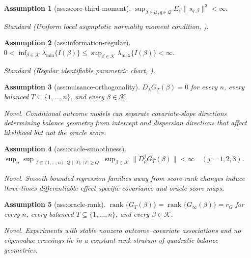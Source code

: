 \documentclass{article}
\newtheorem{assumption}{Assumption}
\begin{document}
\begin{assumption}[ass:score-third-moment]\label{ass:score-third-moment}
\(\sup_{\beta\in\mathcal U,q\in\mathcal Q}E_{\beta}\lVert s_{q,\beta}\rVert^{3}<\infty\).
\par\smallskip\noindent\emph{Standard} (Uniform local asymptotic normality moment condition, \cite{VanDerVaart1998AsymptoticStatistics}).
\end{assumption}

\begin{assumption}[ass:information-regular]\label{ass:information-regular}
\(0<\inf_{\beta\in\mathcal K}\lambda_{\min}\{I(\beta)\}\le\sup_{\beta\in\mathcal K}\lambda_{\max}\{I(\beta)\}<\infty\).
\par\smallskip\noindent\emph{Standard} (Regular identifiable parametric chart, \cite{VanDerVaart1998AsymptoticStatistics}).
\end{assumption}

\begin{assumption}[ass:nuisance-orthogonality]\label{ass:nuisance-orthogonality}
\(D_{\lambda}G_T(\beta)=0\) for every \(n\), every balanced \(T\subseteq\{1,\ldots,n\}\), and every \(\beta\in\mathcal K\).
\par\smallskip\noindent\emph{Novel.} Conditional outcome models can separate covariate-slope directions determining balance geometry from intercept and dispersion directions that affect likelihood but not the oracle score.
\end{assumption}

\begin{assumption}[ass:oracle-smoothness]\label{ass:oracle-smoothness}
\(\sup_{n}\sup_{\substack{T\subseteq\{1,\ldots,n\}:\ Q\mid|T|,\ |T|\ge Q}}\sup_{\beta\in\mathcal K}\lVert D^{j}_{\rho}G_T(\beta)\rVert<\infty\quad(j=1,2,3)\).
\par\smallskip\noindent\emph{Novel.} Smooth bounded regression families away from score-rank changes induce three-times differentiable effect-specific covariance and oracle-score maps.
\end{assumption}

\begin{assumption}[ass:oracle-rank]\label{ass:oracle-rank}
\(\operatorname{rank}\{G_T(\beta)\}=\operatorname{rank}\{G_{\infty}(\beta)\}=r_G\) for every \(n\), every balanced \(T\subseteq\{1,\ldots,n\}\), and every \(\beta\in\mathcal K\).
\par\smallskip\noindent\emph{Novel.} Experiments with stable nonzero outcome--covariate associations and no eigenvalue crossings lie in a constant-rank stratum of quadratic balance geometries.
\end{assumption}
\end{document}
